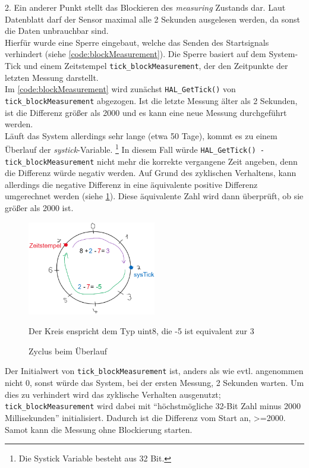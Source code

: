 \documentclass[11pt,a4paper,titlepage]{article}
\begin{document}
2. Ein anderer Punkt stellt das Blockieren des \textit{measuring} Zustands dar.
Laut Datenblatt darf der Sensor maximal alle 2 Sekunden ausgelesen werden, da sonst die Daten unbrauchbar sind.\\
Hierfür wurde eine Sperre eingebaut, welche das Senden des Startsignals verhindert (siehe \cref{code:blockMeasurement}).
Die Sperre basiert auf dem System-Tick und einem Zeitstempel \Verb|tick_blockMeasurement|, der den Zeitpunkte der letzten Messung darstellt.\\
Im \cref{code:blockMeasurement} wird zunächst \Verb|HAL_GetTick()| von \Verb|tick_blockMeasurement| abgezogen.
Ist die letzte Messung älter als 2 Sekunden, ist die Differenz größer als 2000 und es kann eine neue Messung durchgeführt werden.\\
Läuft das System allerdings sehr lange (etwa 50 Tage), kommt es zu einem Überlauf der \textit{systick}-Variable.
\footnote{Die Systick Variable besteht aus 32 Bit.}
In diesem Fall würde \Verb|HAL_GetTick() - tick_blockMeasurement| nicht mehr die korrekte vergangene Zeit angeben,
denn die Differenz würde negativ werden.
Auf Grund des zyklischen Verhaltens, kann allerdings die negative Differenz in eine äquivalente positive Differenz umgerechnet werden (siehe \cref{fig:zyclus}).
Diese äquivalente Zahl wird dann überprüft, ob sie größer als 2000 ist.\\

\begin{figure}[H]
    \centering
    \includegraphics[width=0.5\textwidth]{./Bilder-Tobit/zyclus.png}
    \caption{Zyclus beim Überlauf}
    {\small Der Kreis enspricht dem Typ uint8, die -5 ist equivalent zur 3}
    \label{fig:zyclus}
\end{figure}

Der Initialwert von \Verb|tick_blockMeasurement| ist, anders als wie evtl. angenommen nicht 0,
sonst würde das System, bei der ersten Messung, 2 Sekunden warten.
Um dies zu verhindert wird das zyklische Verhalten ausgenutzt;
\Verb|tick_blockMeasurement| wird dabei mit  ``höchstmögliche 32-Bit Zahl minus 2000 Millisekunden'' initialisiert.
Dadurch ist die Differenz vom Start an, >=2000.
Samot kann die Messung ohne Blockierung starten.
\end{document}
